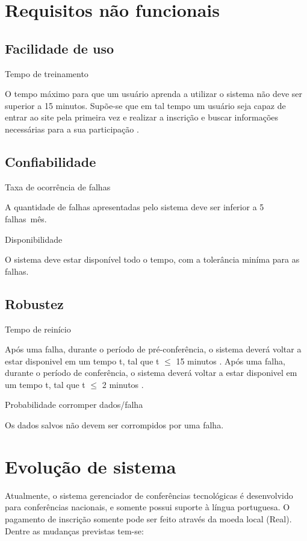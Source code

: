 \documentclass[letter]{article}
\begin{document}
 





\section{Requisitos não funcionais}

\subsection{ Facilidade de uso}
\textbullet Tempo de treinamento

O tempo máximo para que um usuário aprenda a utilizar o sistema não deve ser superior a 15 minutos.
Supõe-se que em tal tempo um usuário seja capaz de entrar ao site 
pela primeira vez e realizar a inscrição e buscar informações necessárias para a sua participação .


\subsection{Confiabilidade}
\textbullet\hspace{1mm} Taxa de ocorrência de falhas

A quantidade de falhas apresentadas pelo sistema deve ser inferior a 5 falhas\ mês.

\textbullet\hspace{1mm} Disponibilidade

O sistema deve estar disponível todo o tempo, com a tolerância miníma para as falhas.


\subsection{Robustez}
\textbullet\hspace{1mm} Tempo de reinício

Após uma falha, durante o período de pré-conferência, o sistema deverá voltar a estar disponivel em um tempo t, tal que t $\leq$ 15 minutos .
Após uma falha, durante o período de conferência, o sistema deverá voltar a estar disponivel em um tempo t, tal que t $\leq$ 2 minutos .

\textbullet\hspace{1mm} Probabilidade corromper dados/falha

Os dados salvos não devem ser corrompidos por uma falha.


\section{Evolução de sistema}
Atualmente, o sistema gerenciador de conferências tecnológicas é desenvolvido para conferências nacionais, e somente possui suporte à língua portuguesa. O pagamento de inscrição somente pode ser feito através da moeda local (Real).
Dentre as mudanças previstas tem-se:
\end{document}
